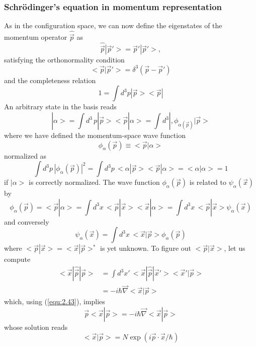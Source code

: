 \subsubsection{Schrödinger's equation in momentum
representation}
As in the configuration space, we can now define the
eigenstates of the momentum operator $\hat{\vec{p}}$ as
\begin{equation}
  \hat{\vec{p}} |\vec{p}'> = \vec{p}' |\vec{p}'>,
  \label{equ:equ:2.43}
\end{equation}
satisfying the orthonormality condition
\begin{equation}
  <\vec{p}|\vec{p}'> = \delta^3(\vec{p}-\vec{p}')
  \label{equ:equ:2.44}
\end{equation}
and the completeness relation
\begin{equation}
  1 = \int d^3 p |\vec{p}><\vec{p}|
  \label{equ:2.45}
\end{equation}
An arbitrary state in the basis reads
\begin{equation}
  |\alpha> = \int d^3\, p |\vec{p}><\vec{p}|\alpha> = \int d^3 |,
  \phi_{\alpha(\vec{p})}|\vec{p}>
  \label{equ:2.46}
\end{equation}
where we have defined the momentum-space wave function
\begin{equation}
  \phi_{\alpha} (\vec{p}) \equiv <\vec{p}|\alpha>
  \label{equ:2.47}
\end{equation}
normalized as
\begin{equation}
  \int d^3p \, |\phi_{\alpha}(\vec{p})|^2 = \int d^3p \,
  <\alpha|\vec{p}><\vec{p}|\alpha> = <\alpha|\alpha> = 1
  \label{equ:2.48}
\end{equation}
if $|\alpha>$ is correctly normalized.
The wave function $\phi_{\alpha} (\vec{p})$ is related to
$\psi_{\alpha}(\vec{x})$ by
\begin{equation}
  \phi_{\alpha}(\vec{p}) = <\vec{p}|\alpha> = \int d^3x \,
  <\vec{p}|\vec{x}><\vec{x}|\alpha> = \int d^3 x\,
  <\vec{p}|\vec{x}>\psi_{\alpha}(\vec{x})
  \label{equ:2.49}
\end{equation}
and conversely
\begin{equation}
  \psi_{\alpha}(\vec{x}) = \int d^3 x\, <\vec{x}|\vec{p}>
  \phi_{\alpha}(\vec{p})
  \label{equ:2.50}
\end{equation}
where $<\vec{p}|\vec{x}> = <\vec{x}|\vec{p}>^*$ is yet
unknown. To figure out $<\vec{p}|\vec{x}>$, let us compute
\begin{align}
  <\vec{x}|\hat{\vec{p}}|\vec{p}> &= \int d^3 x' \,
  <\vec{x}|\hat{\vec{p}}|\vec{x}'>
  <\vec{x}'|\vec{p}>\nonumber\\
  &= -i\hbar \vec{\nabla} <\vec{x}|\vec{p}> \label{equ:2.51}
\end{align}
which, using (\ref{equ:2.43}), implies
\begin{equation}
  \vec{p} <\vec{x}|\vec{p}> = -i \hbar
  \vec{\nabla}<\vec{x}|\vec{p}>
  \label{equ:2.52}
\end{equation}
whose solution reads
\begin{equation}
  <\vec{x}|\vec{p}> = N \exp(i \vec{p} \cdot \vec{x}/\hbar)
  \label{equ:2.53}
\end{equation}

